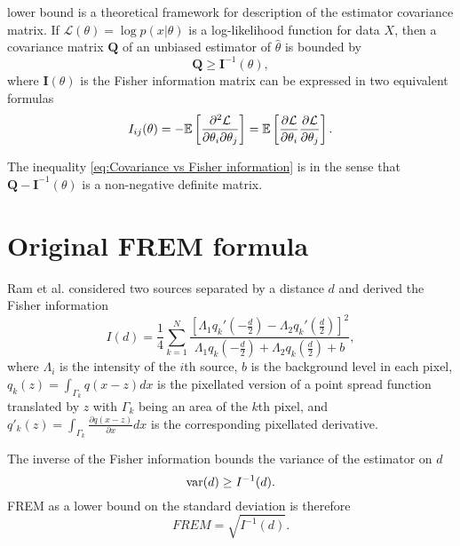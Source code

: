\CR lower bound is a theoretical framework for description of the estimator covariance matrix. If $\mathcal{L}(\theta)=\log p(x|\theta)$ is a log-likelihood function for data $X$, then a covariance matrix $\bm{Q}$ of an unbiased estimator of $\hat{\theta}$ is bounded by \cite{Rao1945,Cover1991} 
%
\begin{equation}
	\bm{Q}\geq\bm{I}^{-1}(\theta),
	\label{eq:Covariance vs Fisher information}
\end{equation}
%
where $\bm{I}(\theta)$ is the Fisher information matrix can be expressed in two equivalent formulas
%
\begin{equation}
	I_{ij}(\theta)=-\mathbb{E}\left[\frac{\partial^2\mathcal{L}}{\partial\theta_i\partial\theta_j}\right]=\mathbb{E}\left[\frac{\partial\mathcal{L}}{\partial\theta_i}\frac{\partial\mathcal{L}}{\partial\theta_j}\right].
	\label{eq:Fisher information general}
\end{equation}

The inequality \autoref{eq:Covariance vs Fisher information} is in the sense that $\bm{Q}-\bm{I}^{-1}(\theta)$ is a non-negative definite matrix.

\section{Original FREM formula\label{sec:FREM orig}}

Ram et al. \cite{Ram2006} considered two sources separated by a distance $d$ and derived the Fisher information
%
\begin{equation}
	I(d)=\frac{1}{4}\sum_{k=1}^N\frac{\left[\Lambda_1q_k'(-\frac{d}{2})-\Lambda_2q_k'(\frac{d}{2})\right]^2}{\Lambda_1q_k(-\frac{d}{2})+\Lambda_2q_k(\frac{d}{2})+b},
	\label{eq:Ram FREM}
\end{equation}
%
where $\Lambda_i$ is the intensity of the $i$th source, $b$ is the background level in each pixel, $q_k(z)=\int_{\Gamma_k}q(x-z)dx$ is the pixellated version of a point spread function translated by $z$ with $\Gamma_k$ being an area of the $k$th pixel, and $q'_k(z)=\int_{\Gamma_k}\frac{\partial q(x-z)}{\partial x}dx$ is the corresponding pixellated derivative. 

The inverse of the Fisher information bounds the variance of the estimator on $d$ 
%
\begin{equation}
	\mathrm{var}(d)\geq I^{-1}(d).
\end{equation}
%
FREM as a lower bound on the standard deviation is therefore
%
\begin{equation}
	\unit{FREM}=\sqrt{I^{-1}(d)}.
	\label{eq:FREM}	
\end{equation}

